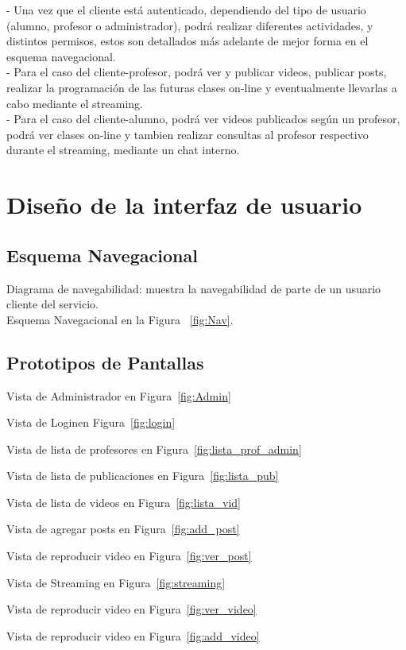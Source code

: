 \documentclass[12pt]{article}
\begin{document}
-	Una vez que el cliente está autenticado, dependiendo del tipo de usuario (alumno, profesor o 
administrador), podrá realizar diferentes actividades, y distintos permisos, estos son detallados
más adelante de mejor forma en el esquema navegacional.\\

-	Para el caso del cliente-profesor, podrá ver y publicar videos, publicar posts, realizar la programación 
de las futuras clases on-line y eventualmente llevarlas a cabo mediante el streaming.\\

-	Para el caso del cliente-alumno, podrá ver videos publicados según un profesor,
podrá ver clases on-line y tambien realizar consultas al profesor respectivo durante el 
streaming, mediante un chat interno.

\newpage
\section{Dise\~no de la interfaz de usuario}
\subsection{Esquema Navegacional}
Diagrama de navegabilidad: muestra la navegabilidad de parte de un usuario cliente del servicio.\\
Esquema Navegacional en la Figura ~\ref{fig:Nav}.

\subsection{Prototipos de Pantallas}
Vista de Administrador en Figura~\ref{fig:Admin}

Vista de Loginen Figura~\ref{fig:login}

Vista de lista de profesores en Figura~\ref{fig:lista_prof_admin}

Vista de lista de publicaciones en Figura~\ref{fig:lista_pub}

Vista de lista de videos en Figura~\ref{fig:lista_vid}

Vista de agregar posts en Figura~\ref{fig:add_post}

Vista de reproducir video en Figura~\ref{fig:ver_post}

Vista de Streaming en Figura~\ref{fig:streaming}

Vista de reproducir video en Figura~\ref{fig:ver_video}

Vista de reproducir video en Figura~\ref{fig:add_video}
\end{document}
